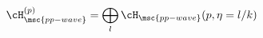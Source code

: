\begin{equation}
 \cH_{\msc{pp-wave}}^{(p)} = 
 \bigoplus_l  \cH_{\msc{pp-wave}}(p, \eta=l/k)
\label{hilbert pp}
\end{equation}

